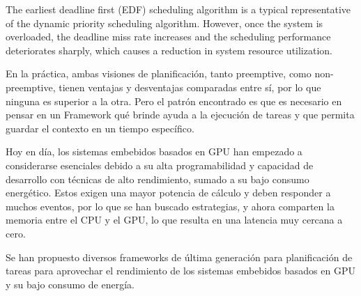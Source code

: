 The earliest deadline first (EDF) scheduling algorithm is a typical representative of the dynamic priority scheduling algorithm. However, once the system is overloaded, the deadline miss rate increases and the scheduling performance deteriorates sharply, which causes a reduction in system resource utilization.

En la práctica, ambas visiones de planificación, tanto preemptive, como non-preemptive, tienen ventajas y desventajas comparadas entre sí, por lo que ninguna es superior a la otra. Pero el patrón encontrado es que es necesario en pensar en un Framework qué brinde ayuda a la ejecución de tareas y que permita guardar el contexto en un tiempo específico. 

Hoy en día, los sistemas embebidos basados en GPU han empezado a considerarse esenciales debido a su alta programabilidad y capacidad de desarrollo con técnicas de alto rendimiento, sumado a su bajo consumo energético. Estos exigen una mayor potencia de cálculo y deben responder a muchos eventos, por lo que se han buscado estrategias, y ahora comparten la memoria entre el CPU y el GPU, lo que resulta en una latencia muy cercana a cero.

Se han propuesto diversos frameworks de última generación para planificación de tareas para aprovechar el rendimiento de los sistemas embebidos basados en GPU y su bajo consumo de energía.






